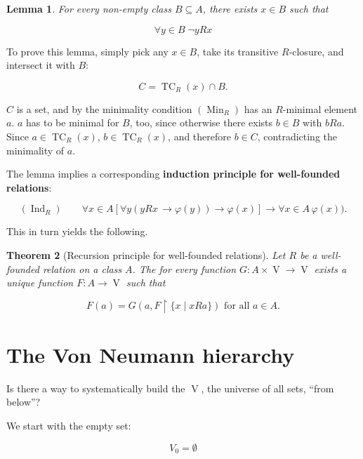 \documentclass{article}
\newcommand{\V}{\Op{V}}
\newcommand{\Rest}[1]{\upharpoonright{#1}}
\newcommand{\Op}[1]{\operatorname{#1}}
\newtheorem{theorem}{Theorem}[section]
\newtheorem{lemma}[theorem]{Lemma}
\begin{document}
\begin{lemma}\label{lem-min-wf}For every non-empty class $B \subseteq A$, there exists $x \in B$ such that

\begin{equation}
\forall y \in B \;  \neg y R x
\end{equation}

\end{lemma}To prove this lemma, simply pick any $x \in B$, take its transitive $R$-closure, and intersect it with $B$:

\begin{equation}
C = \Op{TC}_R(x) \cap B.
\end{equation}

$C$ is a set, and by the minimality condition $(\Op{Min}_R)$ has an $R$-minimal element $a$. $a$ has to be minimal for $B$, too, since otherwise there exists $b \in B$ with $b R a$. Since $a \in \Op{TC}_R(x)$, $b \in \Op{TC}_R(x)$, and therefore $b \in C$, contradicting the minimality of $a$.

The lemma implies a corresponding \textbf{induction principle for well-founded relations}:

\begin{equation*}
(\Op{Ind}_R) \qquad  \forall x \in A [ \forall y ( yRx \, \to \varphi(y)) \to \varphi(x)] \to \forall x \in A \, \varphi(x)).
\end{equation*}

This in turn yields the following.

\begin{theorem}[Recursion principle for well-founded relations]\label{thm-wf-recursion}Let $R$ be a well-founded relation on a class $A$. The for every function $G : A \times \V \longrightarrow  \V$ exists a unique function $F: A \to \V$ such that

\begin{equation*}
F(a) = G(a,F \Rest{\{x \mid xRa\}})  \text{ for all } a \in A.
\end{equation*}
\end{theorem}\section{The Von Neumann hierarchy}

Is there a way to systematically build the $\V$, the universe of all sets, ``from below''?

We start with the empty set:

\begin{equation}
V_0 = \emptyset
\end{equation}
\end{document}
